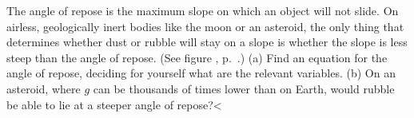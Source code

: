   The angle of repose is the maximum slope on which an
object will not slide. On airless, geologically inert bodies
like the moon or an asteroid, the only thing that determines
whether dust or rubble will stay on a slope is whether the
slope is less steep than the angle of repose. (See figure , p.~\pageref{fig:toutatis}.)\hwendpart
 (a) Find an
equation for the angle of repose, deciding for yourself what
are the relevant variables.\hwendpart
 (b) On an asteroid, where $g$
can be thousands of times lower than on Earth, would rubble
be able to lie at a steeper angle of repose?<%
